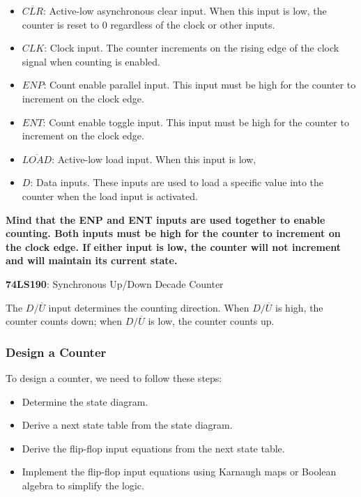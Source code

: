 \documentclass[
  a4paper,
]{article}
\providecommand{\tightlist}{%
  \setlength{\itemsep}{0pt}\setlength{\parskip}{0pt}}
\begin{document}
\begin{itemize}
\tightlist
\item
  \(\overline{CLR}\): Active-low asynchronous clear input. When this
  input is low, the counter is reset to 0 regardless of the clock or
  other inputs.
\item
  \(CLK\): Clock input. The counter increments on the rising edge of the
  clock signal when counting is enabled.
\item
  \(ENP\): Count enable parallel input. This input must be high for the
  counter to increment on the clock edge.
\item
  \(ENT\): Count enable toggle input. This input must be high for the
  counter to increment on the clock edge.
\item
  \(\overline{LOAD}\): Active-low load input. When this input is low,
\item
  \(D\): Data inputs. These inputs are used to load a specific value
  into the counter when the load input is activated.
\end{itemize}

\textbf{Mind that the ENP and ENT inputs are used together to enable
counting. Both inputs must be high for the counter to increment on the
clock edge. If either input is low, the counter will not increment and
will maintain its current state.}

\textbf{74LS190}: Synchronous Up/Down Decade Counter

The \(D/\overline{U}\) input determines the counting direction. When
\(D/\overline{U}\) is high, the counter counts down; when
\(D/\overline{U}\) is low, the counter counts up.

\subsubsection{Design a Counter}\label{design-a-counter}

To design a counter, we need to follow these steps:

\begin{itemize}
\tightlist
\item
  Determine the state diagram.
\item
  Derive a next state table from the state diagram.
\item
  Derive the flip-flop input equations from the next state table.
\item
  Implement the flip-flop input equations using Karnaugh maps or Boolean
  algebra to simplify the logic.
\end{itemize}
\end{document}
